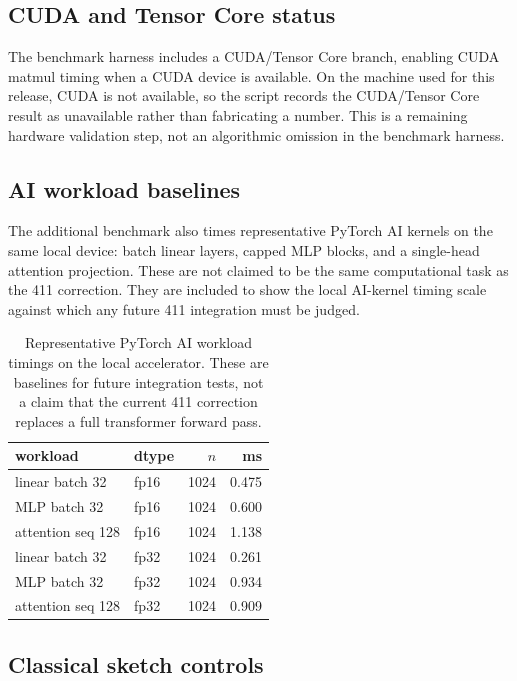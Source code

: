 \documentclass[11pt]{article}
\begin{document}
\subsection{CUDA and Tensor Core status}

The benchmark harness includes a CUDA/Tensor Core branch, enabling CUDA matmul
timing when a CUDA device is available.  On the machine used for this release,
CUDA is not available, so the script records the CUDA/Tensor Core result as
unavailable rather than fabricating a number.  This is a remaining hardware
validation step, not an algorithmic omission in the benchmark harness.

\subsection{AI workload baselines}

The additional benchmark also times representative PyTorch AI kernels on the
same local device: batch linear layers, capped MLP blocks, and a single-head
attention projection.  These are not claimed to be the same computational task
as the 411 correction.  They are included to show the local AI-kernel timing
scale against which any future 411 integration must be judged.

\begin{table}[htbp]
\centering
\small
\begin{tabular}{llrr}
\toprule
workload & dtype & \(n\) & ms\\
\midrule
linear batch 32 & fp16 & 1024 & 0.475\\
MLP batch 32 & fp16 & 1024 & 0.600\\
attention seq 128 & fp16 & 1024 & 1.138\\
linear batch 32 & fp32 & 1024 & 0.261\\
MLP batch 32 & fp32 & 1024 & 0.934\\
attention seq 128 & fp32 & 1024 & 0.909\\
\bottomrule
\end{tabular}
\caption{Representative PyTorch AI workload timings on the local accelerator.
These are baselines for future integration tests, not a claim that the current
411 correction replaces a full transformer forward pass.}
\label{tab:aiworkloads}
\end{table}

\subsection{Classical sketch controls}
\end{document}
